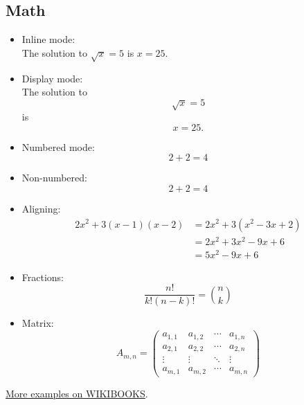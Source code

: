 \subsection{Math}
\label{ss:Math}
\begin{itemize}
    \item Inline mode:\\
The solution to $\sqrt{x} = 5$ is $x=25$.
    \item Display mode:\\
The solution to \[\sqrt{x} = 5\] is \[x=25.\]
    \item Numbered mode:
\begin{equation}
2+2=4
\end{equation}
    \item Non-numbered:
\begin{equation*}
2+2=4
\end{equation*}
    \item Aligning:
\begin{align*}
2x^2 + 3(x-1)(x-2) & = 2x^2 + 3(x^2-3x+2)\\
&= 2x^2 + 3x^2 - 9x + 6\\
&= 5x^2 - 9x + 6
\end{align*}
     \item Fractions:
\[
 \frac{n!}{k!(n-k)!} = \binom{n}{k}
\]
    \item Matrix:
\[
 A_{m,n} =
 \begin{pmatrix}
  a_{1,1} & a_{1,2} & \cdots & a_{1,n} \\
  a_{2,1} & a_{2,2} & \cdots & a_{2,n} \\
  \vdots  & \vdots  & \ddots & \vdots  \\
  a_{m,1} & a_{m,2} & \cdots & a_{m,n}
 \end{pmatrix}
\]
\end{itemize}
\href{http://en.wikibooks.org/wiki/LaTeX/Mathematics}{More examples on WIKIBOOKS}.


